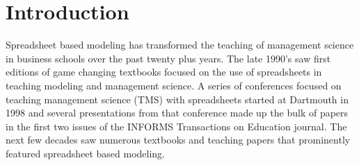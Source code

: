 \documentclass[ited,blindrev]{informs3}              %
\begin{document}
%


\section{Introduction}

Spreadsheet based modeling has transformed the teaching of management science in business schools over the past twenty plus years. The late 1990's saw first editions of game changing textbooks \cite{winstonPracticalManagementScience2018,ragsdaleSpreadsheetModelingDecision2017} focused on the use of spreadsheets in teaching modeling and management science.  A series of conferences focused on teaching management science (TMS) with spreadsheets started at Dartmouth in 1998 and several presentations from that conference made up the bulk of papers in the first two issues of the INFORMS Transactions on Education journal. The next few decades saw numerous textbooks \cite{BusinessAnalyticsArt, BusinessAnalytics4th} and teaching papers \cite{INFORMSTransactionsEducation2014} that prominently featured spreadsheet based modeling.
\end{document}

